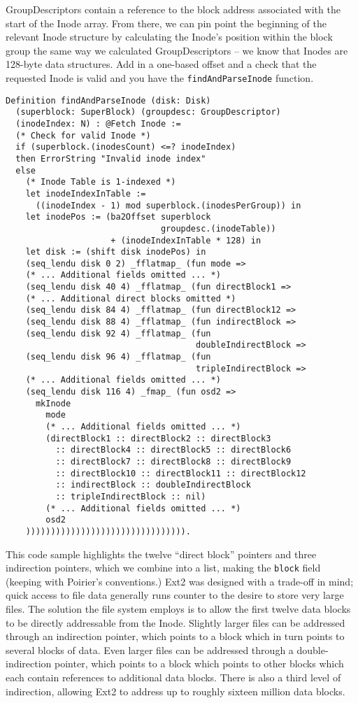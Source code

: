 \documentclass[nocopyrightspace]{sigplanconf}
\begin{document}
GroupDescriptors contain a reference to the block address associated with the
start of the Inode array. From there, we can pin point the beginning of the
relevant Inode structure by calculating the Inode's position within the block
group the same way we calculated GroupDescriptors -- we know that Inodes are
128-byte data structures.  Add in a one-based offset and a check that the
requested Inode is valid and you have the {\tt findAndParseInode} function.

\begin{lstlisting}
Definition findAndParseInode (disk: Disk) 
  (superblock: SuperBlock) (groupdesc: GroupDescriptor)
  (inodeIndex: N) : @Fetch Inode :=
  (* Check for valid Inode *)
  if (superblock.(inodesCount) <=? inodeIndex)
  then ErrorString "Invalid inode index"
  else
    (* Inode Table is 1-indexed *)
    let inodeIndexInTable := 
      ((inodeIndex - 1) mod superblock.(inodesPerGroup)) in
    let inodePos := (ba2Offset superblock
                               groupdesc.(inodeTable))
                     + (inodeIndexInTable * 128) in
    let disk := (shift disk inodePos) in
    (seq_lendu disk 0 2) _fflatmap_ (fun mode =>
    (* ... Additional fields omitted ... *)
    (seq_lendu disk 40 4) _fflatmap_ (fun directBlock1 =>
    (* ... Additional direct blocks omitted *)
    (seq_lendu disk 84 4) _fflatmap_ (fun directBlock12 =>
    (seq_lendu disk 88 4) _fflatmap_ (fun indirectBlock =>
    (seq_lendu disk 92 4) _fflatmap_ (fun 
                                      doubleIndirectBlock =>
    (seq_lendu disk 96 4) _fflatmap_ (fun 
                                      tripleIndirectBlock =>
    (* ... Additional fields omitted ... *)
    (seq_lendu disk 116 4) _fmap_ (fun osd2 =>
      mkInode
        mode
        (* ... Additional fields omitted ... *)
        (directBlock1 :: directBlock2 :: directBlock3
          :: directBlock4 :: directBlock5 :: directBlock6
          :: directBlock7 :: directBlock8 :: directBlock9
          :: directBlock10 :: directBlock11 :: directBlock12
          :: indirectBlock :: doubleIndirectBlock
          :: tripleIndirectBlock :: nil)
        (* ... Additional fields omitted ... *)
        osd2
    )))))))))))))))))))))))))))))))).
\end{lstlisting}

This code sample highlights the twelve ``direct block'' pointers and three
indirection pointers, which we combine into a list, making the {\tt block}
field (keeping with Poirier's conventions.) Ext2 was designed with a trade-off
in mind; quick access to file data generally runs counter to the desire to
store very large files.  The solution the file system employs is to allow the
first twelve data blocks to be directly addressable from the Inode. Slightly
larger files can be addressed through an indirection pointer, which points to
a block which in turn points to several blocks of data. Even larger files can
be addressed through a double-indirection pointer, which points to a block
which points to other blocks which each contain references to additional data
blocks. There is also a third level of indirection, allowing Ext2 to address
up to roughly sixteen million data blocks.
\end{document}
